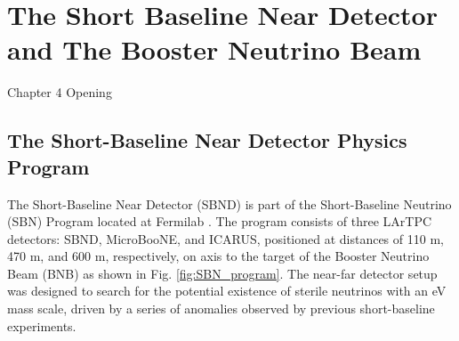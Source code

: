 \chapter{The Short Baseline Near Detector and The Booster Neutrino Beam}

\ifpdf
    \graphicspath{{Chapter4/Figs/Raster/}{Chapter4/Figs/PDF/}{Chapter4/Figs/}}
\else
    \graphicspath{{Chapter4/Figs/Vector/}{Chapter4/Figs/}}
\fi


Chapter 4 Opening

\newpage
\section{The Short-Baseline Near Detector Physics Program}


The Short-Baseline Near Detector (SBND) is part of the Short-Baseline Neutrino (SBN) Program located at Fermilab \cite{SBNProgram}. 
The program consists of three LArTPC detectors: SBND, MicroBooNE, and ICARUS, positioned at distances of 110 m, 470 m, and 600 m, respectively, on axis to the target of the Booster Neutrino Beam (BNB) as shown in Fig. \ref{fig:SBN_program}.
The near-far detector setup was designed to search for the potential existence of sterile neutrinos with an eV mass scale, driven by a series of anomalies observed by previous short-baseline experiments.

